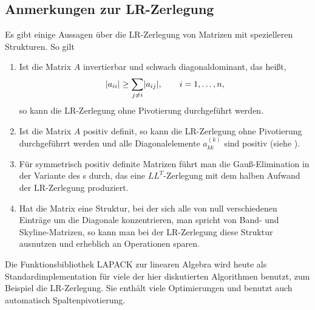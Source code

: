 \subsection{Anmerkungen zur LR-Zerlegung}

\begin{remark}
  Es gibt einige Aussagen über die LR-Zerlegung von Matrizen mit
  spezielleren Strukturen. So gilt
  \begin{enumerate}
  \item Ist die Matrix $A$ invertierbar und schwach diagonaldominant,
    das heißt,
    \begin{gather}
      \lvert a_{ii}\rvert \ge \sum_{j\neq i} \lvert a_{ij}\rvert,
      \qquad i=1,\dots,n,
    \end{gather}
    so kann die LR-Zerlegung ohne Pivotierung durchgeführt werden.
  \item Ist die Matrix $A$ positiv definit, so kann die LR-Zerlegung
    ohne Pivotierung durchgeführrt werden und alle Diagonalelemente
    $a_{kk}^{(k)}$ sind positiv (siehe \cite[Satz 4.7]{Rannacher17}).
  \item Für symmetrisch positiv definite Matrizen führt man die
    Gauß-Elimination in der Variante des
    s durch, das eine $LL^T$-Zerlegung
    mit dem halben Aufwand der LR-Zerlegung produziert.
  \item Hat die Matrix eine Struktur, bei der sich alle von null
    verschiedenen Einträge um die Diagonale konzentrieren, man spricht
    von Band- und Skyline-Matrizen, so kann man bei der LR-Zerlegung
    diese Struktur ausnutzen und erheblich an Operationen sparen.
  \end{enumerate}
\end{remark}

\begin{remark}
  Die Funktionsbibliothek LAPACK zur linearen Algebra wird heute als
  Standardimplementation für viele der hier diskutierten Algorithmen
  benutzt, zum Beispiel die LR-Zerlegung. Sie enthält viele
  Optimierungen und benutzt auch automatisch Spaltenpivotierung.
\end{remark}



